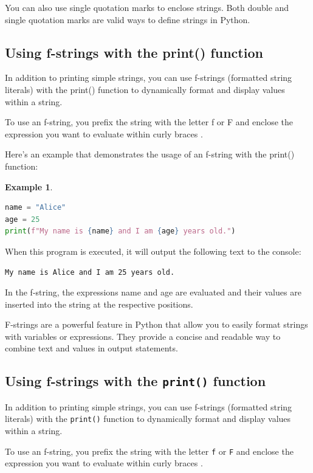 \documentclass[12pt]{article}
\newtheorem{Example}{Example}[section]
\begin{document}
You can also use single quotation marks to enclose strings. Both double and single quotation marks are valid ways to define strings in Python.

\subsection{Using f-strings with the print() function}
In addition to printing simple strings, you can use f-strings (formatted string literals) with the print() function to dynamically format and display values within a string.

To use an f-string, you prefix the string with the letter f or F and enclose the expression you want to evaluate within curly braces {}.

Here's an example that demonstrates the usage of an f-string with the print() function:

\begin{Example}
\begin{lstlisting}[language=Python]
name = "Alice"
age = 25
print(f"My name is {name} and I am {age} years old.")
\end{lstlisting}
\end{Example}

When this program is executed, it will output the following text to the console:

\begin{verbatim}
My name is Alice and I am 25 years old.
\end{verbatim}

In the f-string, the expressions {name} and {age} are evaluated and their values are inserted into the string at the respective positions.

F-strings are a powerful feature in Python that allow you to easily format strings with variables or expressions. They provide a concise and readable way to combine text and values in output statements.




\subsection{Using f-strings with the \texttt{print()} function}
In addition to printing simple strings, you can use f-strings (formatted string literals) with the \texttt{print()} function to dynamically format and display values within a string.

To use an f-string, you prefix the string with the letter \texttt{f} or \texttt{F} and enclose the expression you want to evaluate within curly braces \texttt{{}}.
\end{document}
